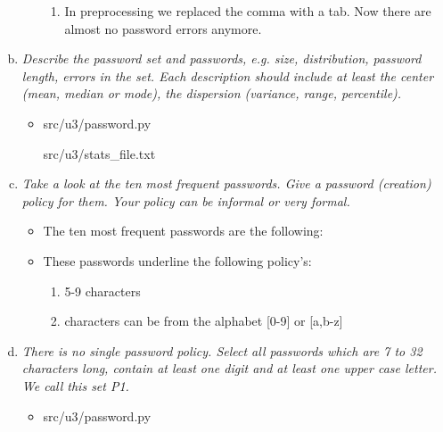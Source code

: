 \begin{enumerate}[(a)]
\begin{itemize}
\begin{enumerate}[1.]
            \item In preprocessing we replaced the comma with a tab. Now there are almost no password errors anymore.
            									
            

        \end{enumerate}
    \end{itemize}
\newpage        
    \item {\itshape Describe the password set and passwords, e.g. size, distribution, password length, errors in the set. Each description should include at least the center (mean, median or mode), the dispersion (variance, range, percentile).}
    \begin{itemize}
        \item 
            {src/u3/password.py}
            
            {src/u3/stats_file.txt}
    \end{itemize}

    \item {\itshape Take a look at the ten most frequent passwords. Give a password (creation) policy for them. Your policy can be informal or very formal.}
    \begin{itemize}
        \item The ten most frequent passwords are the following:
        
        \item These passwords underline the following policy's:
        \begin{enumerate}[1.]
            \item 5-9 characters
            \item characters can be from the alphabet [0-9] or [a,b-z] 
        \end{enumerate}
    \end{itemize}
    
        
    
    
    \item {\itshape There is no single password policy. Select all passwords which are 7 to 32 characters long, contain at least one digit and at least one upper case letter. We call this set P1.}
    \begin{itemize}
        \item 
        {src/u3/password.py}
    \end{itemize}	
    

\end{enumerate}
